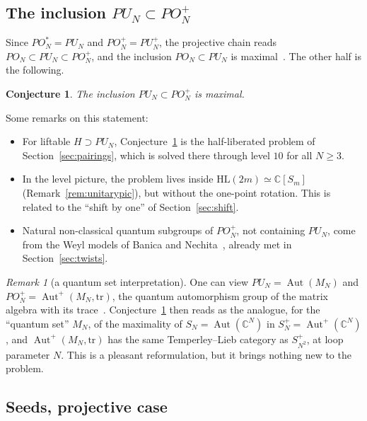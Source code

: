\documentclass[11pt]{amsart}
\newtheorem{conjecture}[theorem]{Conjecture}
\theoremstyle{definition}
\theoremstyle{remark}
\newtheorem{remark}[theorem]{Remark}
\theoremstyle{plain}
\numberwithin{equation}{section}
\numberwithin{table}{section}
\newcommand{\C}{\mathbb C}
\newcommand{\HL}{\mathrm{HL}}
\DeclareMathOperator{\Aut}{Aut}
\begin{document}
\subsection{The inclusion $PU_N\subset PO_N^+$}

Since $PO_N^*=PU_N$ and $PO_N^+=PU_N^+$, the projective chain reads $PO_N\subset PU_N\subset PO_N^+$, and the inclusion $PO_N\subset PU_N$ is maximal~\cite{bbcc}. The other half is the following.

\begin{conjecture}\label{conj:mn}
The inclusion $PU_N\subset PO_N^+$ is maximal.
\end{conjecture}

Some remarks on this statement:
\begin{itemize}
\item For liftable $H\supset PU_N$, Conjecture~\ref{conj:mn} is the half-liberated problem of Section~\ref{sec:pairings}, which is solved there through level $10$ for all $N\ge3$.
\item In the level picture, the problem lives inside $\HL(2m)\simeq\C[S_m]$ (Remark~\ref{rem:unitarypic}), but without the one-point rotation. This is related to the ``shift by one'' of Section~\ref{sec:shift}.
\item Natural non-classical quantum subgroups of $PO_N^+$, not containing $PU_N$, come from the Weyl models of Banica and Nechita~\cite{bn}, already met in Section~\ref{sec:twists}.
\end{itemize}

\begin{remark}[a quantum set interpretation]
One can view $PU_N=\Aut(M_N)$ and $PO_N^+=\Aut^+(M_N,\mathrm{tr})$, the quantum automorphism group of the matrix algebra with its trace~\cite{ba,bqp,wa}. Conjecture~\ref{conj:mn} then reads as the analogue, for the ``quantum set'' $M_N$, of the maximality of $S_N=\Aut(\C^N)$ in $S_N^+=\Aut^+(\C^N)$, and $\Aut^+(M_N,\mathrm{tr})$ has the same Temperley--Lieb category as $S_{N^2}^+$, at loop parameter $N$. This is a pleasant reformulation, but it brings nothing new to the problem.
\end{remark}

\subsection{Seeds, projective case}
\end{document}
